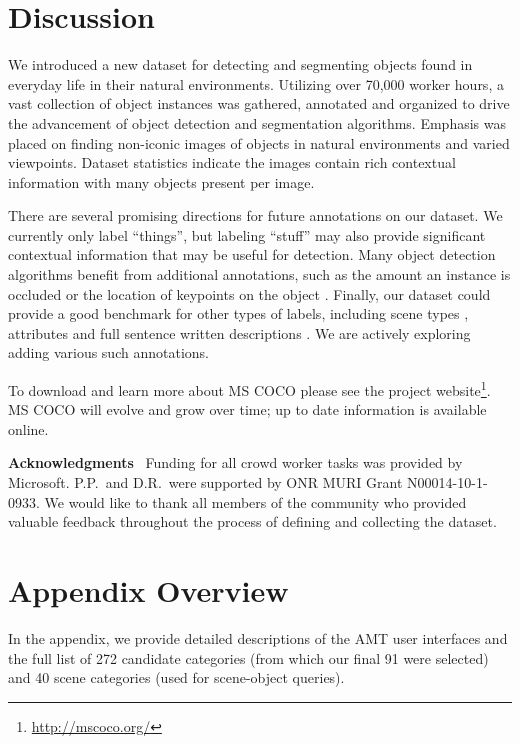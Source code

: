 \section{Discussion}

We introduced a new dataset for detecting and segmenting objects found in everyday life in their natural environments. Utilizing over 70,000 worker hours, a vast collection of object instances was gathered, annotated and organized to drive the advancement of object detection and segmentation algorithms. Emphasis was placed on finding non-iconic images of objects in natural environments and varied viewpoints. Dataset statistics indicate the images contain rich contextual information with many objects present per image.

There are several promising directions for future annotations on our dataset. We currently only label ``things'', but labeling ``stuff'' may also provide significant contextual information that may be useful for detection. Many object detection algorithms benefit from additional annotations, such as the amount an instance is occluded \cite{Dollar2012PAMI} or the location of keypoints on the object \cite{bourdev2009poselets}. Finally, our dataset could provide a good benchmark for other types of labels, including scene types \cite{SUN}, attributes \cite{Patterson2012SunAttributes,farhadi2009describing} and full sentence written descriptions \cite{rashtchian2010collecting}. We are actively exploring adding various such annotations.

To download and learn more about MS COCO please see the project website\footnote{\url{http://mscoco.org/}}. MS COCO will evolve and grow over time; up to date information is available online.

{\textbf{Acknowledgments}~ Funding for all crowd worker tasks was provided by Microsoft. P.P.~and D.R.~were supported by ONR MURI Grant N00014-10-1-0933. We would like to thank all members of the community who provided valuable feedback throughout the process of defining and collecting the dataset.}

\section*{Appendix Overview}

In the appendix, we provide detailed descriptions of the AMT user interfaces and the full list of 272 candidate categories (from which our final 91 were selected) and 40 scene categories (used for scene-object queries).

